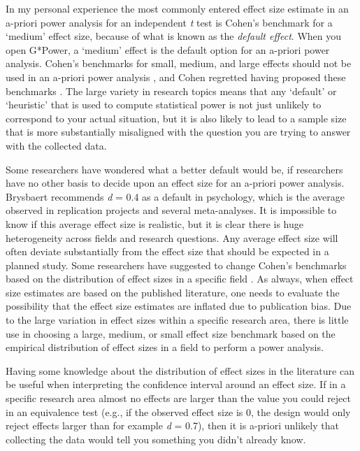 \documentclass[
]{krantz}
\begin{document}
In my personal experience the most commonly entered effect size estimate in an a-priori power analysis for an independent \emph{t} test is Cohen's benchmark for a `medium' effect size, because of what is known as the \emph{default effect}. When you open G*Power, a `medium' effect is the default option for an a-priori power analysis. Cohen's benchmarks for small, medium, and large effects should not be used in an a-priori power analysis \citep{cook_assessing_2014, correll_avoid_2020}, and Cohen regretted having proposed these benchmarks \citep{funder_evaluating_2019}. The large variety in research topics means that any `default' or `heuristic' that is used to compute statistical power is not just unlikely to correspond to your actual situation, but it is also likely to lead to a sample size that is more substantially misaligned with the question you are trying to answer with the collected data.

Some researchers have wondered what a better default would be, if researchers have no other basis to decide upon an effect size for an a-priori power analysis. Brysbaert \citeyearpar{brysbaert_how_2019-1} recommends \emph{d} = 0.4 as a default in psychology, which is the average observed in replication projects and several meta-analyses. It is impossible to know if this average effect size is realistic, but it is clear there is huge heterogeneity across fields and research questions. Any average effect size will often deviate substantially from the effect size that should be expected in a planned study. Some researchers have suggested to change Cohen's benchmarks based on the distribution of effect sizes in a specific field \citep{bosco_correlational_2015, hill_empirical_2008, kraft_interpreting_2020, lovakov_empirically_2017, funder_evaluating_2019}. As always, when effect size estimates are based on the published literature, one needs to evaluate the possibility that the effect size estimates are inflated due to publication bias. Due to the large variation in effect sizes within a specific research area, there is little use in choosing a large, medium, or small effect size benchmark based on the empirical distribution of effect sizes in a field to perform a power analysis.

Having some knowledge about the distribution of effect sizes in the literature can be useful when interpreting the confidence interval around an effect size. If in a specific research area almost no effects are larger than the value you could reject in an equivalence test (e.g., if the observed effect size is 0, the design would only reject effects larger than for example \emph{d} = 0.7), then it is a-priori unlikely that collecting the data would tell you something you didn't already know.
\end{document}
